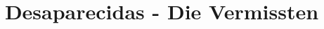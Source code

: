 \documentclass[a4paper, pagesize, DIV=16, fontsize=10pt, parskip=half, oneside, BCOR=5mm]{scrartcl}
\begin{document}
\title{Desaparecidas - Die Vermissten}
\date{}

\maketitle

\newcommand{\rn}[1]{\Rnode{#1}}
\newcommand{\rl}[2]{\ncline[linestyle=solid,arrows=->,nodesepA=0.5pt,linecolor=gray, strokeopacity=0.5]{#1}{#2}}
\newcommand{\sidenote}[1]{\marginpar[#1]{#1}}



\end{document}
